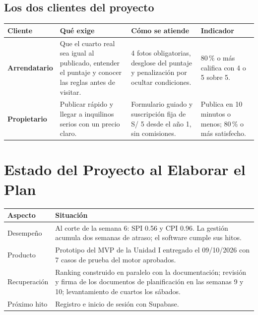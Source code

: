 \documentclass[11pt,a4paper]{article}
\begin{document}
\subsection{Los dos clientes del proyecto}
{\small
{}
\noindent\begin{tabularx}{\textwidth}{@{}P{2.3cm} L L P{3.0cm}@{}}
\toprule
{}
\textbf{Cliente} & \textbf{Qué exige} & \textbf{Cómo se atiende} & \textbf{Indicador} \\
\midrule
\textbf{Arrendatario} & Que el cuarto real sea igual al publicado, entender el puntaje y conocer las reglas antes de visitar. & 4 fotos obligatorias, desglose del puntaje y penalización por ocultar condiciones. & 80\,\% o más califica con 4 o 5 sobre 5. \\
\textbf{Propietario} & Publicar rápido y llegar a inquilinos serios con un precio claro. & Formulario guiado y suscripción fija de S/ 5 desde el año 1, sin comisiones. & Publica en 10 minutos o menos; 80\,\% o más satisfecho. \\
\bottomrule
\end{tabularx}
}

\section{Estado del Proyecto al Elaborar el Plan}
{\small
{}
\noindent\begin{tabularx}{\textwidth}{@{}P{3.6cm} L@{}}
\toprule
{}
\textbf{Aspecto} & \textbf{Situación} \\
\midrule
Desempeño & Al corte de la semana 6: SPI 0.56 y CPI 0.96. La gestión acumula dos semanas de atraso; el software cumple sus hitos. \\
Producto & Prototipo del MVP de la Unidad I entregado el 09/10/2026 con 7 casos de prueba del motor aprobados. \\
Recuperación & Ranking construido en paralelo con la documentación; revisión y firma de los documentos de planificación en las semanas 9 y 10; levantamiento de cuartos los sábados. \\
Próximo hito & Registro e inicio de sesión con Supabase. \\
\bottomrule
\end{tabularx}
}

\end{document}
